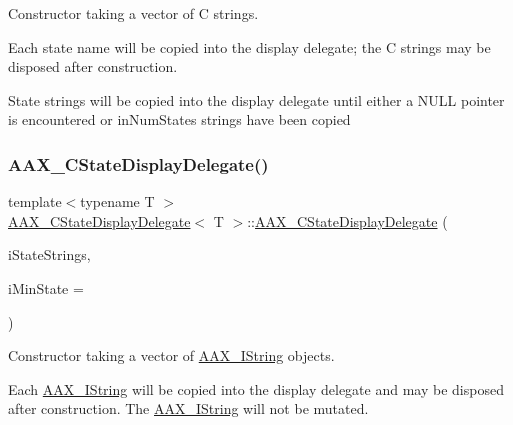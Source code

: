 Constructor taking a vector of C strings. 

Each state name will be copied into the display delegate; the C strings may be disposed after construction.

State strings will be copied into the display delegate until either a N\+U\+LL pointer is encountered or {\ttfamily in\+Num\+States} strings have been copied \mbox{\label{a01561_a9c5b254c68a200198a599026a76e1945}} 
\subsubsection{\texorpdfstring{AAX\_CStateDisplayDelegate()}{AAX\_CStateDisplayDelegate()}\hspace{0.1cm}{\footnotesize\ttfamily [3/4]}}
{\footnotesize\ttfamily template$<$typename T $>$ \\
\mbox{\hyperlink{a01561}{A\+A\+X\+\_\+\+C\+State\+Display\+Delegate}}$<$ T $>$\+::\mbox{\hyperlink{a01561}{A\+A\+X\+\_\+\+C\+State\+Display\+Delegate}} (\begin{DoxyParamCaption}\item[{const std\+::vector$<$ \mbox{\hyperlink{a01873}{A\+A\+X\+\_\+\+I\+String}} $\ast$ $>$ \&}]{i\+State\+Strings,  }\item[{T}]{i\+Min\+State = {} }\end{DoxyParamCaption})\hspace{0.3cm}{\ttfamily [explicit]}}



Constructor taking a vector of \mbox{\hyperlink{a01873}{A\+A\+X\+\_\+\+I\+String}} objects. 

Each \mbox{\hyperlink{a01873}{A\+A\+X\+\_\+\+I\+String}} will be copied into the display delegate and may be disposed after construction. The \mbox{\hyperlink{a01873}{A\+A\+X\+\_\+\+I\+String}} will not be mutated. \mbox{\label{a01561_af6651ca6959ea8963c91f89390ff9e35}} 
